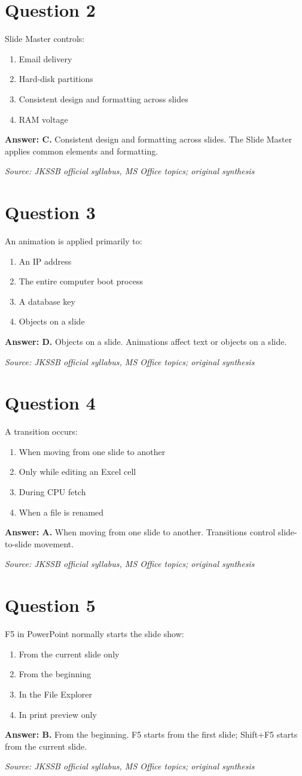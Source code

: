 \documentclass[11pt,a4paper]{book}
\newcommand{\source}[1]{\par\smallskip\textit{Source: #1}}
\newcommand{\answer}[2]{\par\textbf{Answer: #1.} #2}
\begin{document}
\section*{Question 2}
Slide Master controls:
\begin{enumerate}[label=\Alph*.]
\item Email delivery
\item Hard-disk partitions
\item Consistent design and formatting across slides
\item RAM voltage
\end{enumerate}
\answer{C}{Consistent design and formatting across slides. The Slide Master applies common elements and formatting.}
\source{JKSSB official syllabus, MS Office topics; original synthesis}
\section*{Question 3}
An animation is applied primarily to:
\begin{enumerate}[label=\Alph*.]
\item An IP address
\item The entire computer boot process
\item A database key
\item Objects on a slide
\end{enumerate}
\answer{D}{Objects on a slide. Animations affect text or objects on a slide.}
\source{JKSSB official syllabus, MS Office topics; original synthesis}
\section*{Question 4}
A transition occurs:
\begin{enumerate}[label=\Alph*.]
\item When moving from one slide to another
\item Only while editing an Excel cell
\item During CPU fetch
\item When a file is renamed
\end{enumerate}
\answer{A}{When moving from one slide to another. Transitions control slide-to-slide movement.}
\source{JKSSB official syllabus, MS Office topics; original synthesis}
\section*{Question 5}
F5 in PowerPoint normally starts the slide show:
\begin{enumerate}[label=\Alph*.]
\item From the current slide only
\item From the beginning
\item In the File Explorer
\item In print preview only
\end{enumerate}
\answer{B}{From the beginning. F5 starts from the first slide; Shift+F5 starts from the current slide.}
\source{JKSSB official syllabus, MS Office topics; original synthesis}
\end{document}
